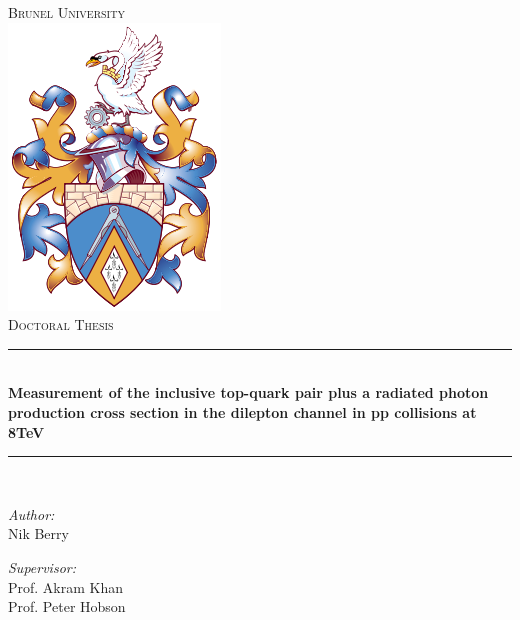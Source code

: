 \documentclass[oneside, a4paper, 11pt, ]{report}
\title{\ttitle} %
\begin{document}
\fancyfoot[C]{\thepage}
\renewcommand{\headrulewidth}{0.4pt}
\newcommand{\HRule}{\rule{\linewidth}{0.5mm}} %



\begin{titlepage}
\begin{center}

\textsc{\LARGE Brunel University}\\[0.5cm] %
\includegraphics[scale=0.5]{Figures/brunelshield.png} \\[0.5cm]
\textsc{\Large Doctoral Thesis}\\[0.5cm] %

\HRule \\[0.4cm] %
{\huge \bfseries Measurement of the inclusive top-quark pair plus a radiated photon production cross section in the dilepton channel in pp collisions at 8TeV}\\[0.3cm] 
\HRule \\[1.5cm] %
 
\begin{minipage}{0.4\textwidth}
\begin{flushleft} \large
\emph{Author:}\\
Nik Berry 
\end{flushleft}
\end{minipage}
\begin{minipage}{0.4\textwidth}
\begin{flushright} \large
\emph{Supervisor:} \\
Prof. Akram Khan\\
Prof. Peter Hobson
\end{flushright}
\end{minipage}\\[2cm]


\end{center}
\end{titlepage}
\end{document}
